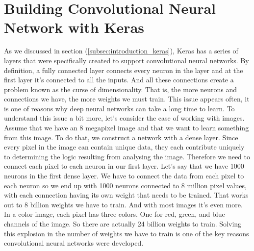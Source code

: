 \section{Building Convolutional Neural Network with Keras}
\label{sec:buildcnn}
%
As we discussed in section (\ref{subsec:introduction_keras}), Keras 
has a series of layers that were specifically created to support convolutional 
neural networks.
By definition, a fully connected layer connects every neuron in the layer and 
at the first layer it's connected to all the inputs. 
And all these connections create a problem known as the curse of 
dimensionality. 
That is, the more neurons and connections we have, the more weights we must 
train. 
This issue appears often, it is one of reasons why deep neural networks can 
take a long time to learn. 
To understand this issue a bit more, let's consider the case of working with 
images. 
Assume that we have an 8 megapixel image and that we want to learn 
something from this image. 
To do that, we construct a network with a dense layer. 
Since every pixel in the image can contain unique data, they each contribute 
uniquely to determining the logic resulting from analysing the image. 
Therefore we need to connect each pixel to each neuron in our first layer. 
Let's say that we have 1000 neurons in the first dense layer.
We have to connect the data from each pixel to each neuron so we end up with 
1000 neurons connected to 8 million pixel values, with each connection having 
its own weight that needs to be trained. 
That works out to 8 billion weights we have to train. 
And with most images it's even more. In a color image, each pixel has three 
colors. 
One for red, green, and blue channels of the image. 
So there are actually 24 billion weights to train.
Solving this explosion in the number of weights we have to train is one of the 
key reasons convolutional neural networks were developed. 
%
